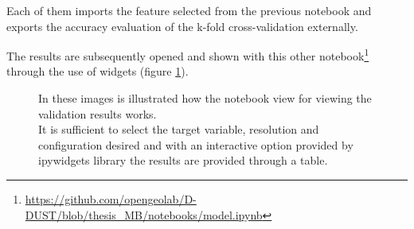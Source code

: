 Each of them imports the feature selected from the previous notebook and exports the accuracy evaluation of the k-fold cross-validation externally. \par
The results are subsequently opened and shown with
this other notebook\footnote{\url{https://github.com/opengeolab/D-DUST/blob/thesis_MB/notebooks/model.ipynb}} through the use of widgets (figure \ref{fig:view}).
\begin{figure}[H] 
    \centering
    \hfill%
    \caption{In these images is illustrated how the notebook view for viewing the validation results works. \\
    It is sufficient to select the target variable, resolution and configuration desired and with an interactive option provided by ipywidgets library the results are provided through a table.}
    \label{fig:view}
\end{figure}

